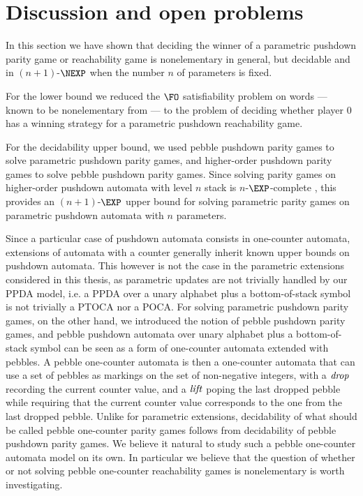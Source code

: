 {\section{Discussion and open problems}\label{discuss ppda}

In this section we have shown that
deciding
the winner of a parametric pushdown parity game or reachability game is nonelementary in general, but
decidable and in $(n+1)$-$\NEXP$ when the number $n$ of parameters is fixed.

	For the lower bound
we reduced the $\FO$ satisfiability problem on words \---- known to be nonelementary
from \cite{Sto74} \---- to the
problem of deciding whether player $0$ has a winning strategy for a parametric pushdown reachability game.

	For the decidability upper bound, we  used
	pebble pushdown parity games
	to solve 
	parametric pushdown parity games, and 
	 higher-order pushdown parity games to solve pebble pushdown parity games.
 Since solving parity games on higher-order pushdown automata with level $n$ stack is $n$-$\EXP$-complete \cite{ Cach03, cachat2007complexity}, this provides an $(n+1)$-$\EXP$ upper bound for solving parametric parity games on parametric pushdown automata with $n$ parameters.







 Since a particular case of pushdown automata consists in one-counter automata, extensions of automata with a counter generally inherit known upper bounds on pushdown automata. 
This however is not the case in
the parametric extensions considered in this thesis, as parametric updates
 are not trivially handled by our PPDA model, i.e. a PPDA over a unary alphabet plus a bottom-of-stack symbol is not trivially a PTOCA nor a POCA. 
For solving parametric pushdown parity games, on the other hand, we introduced the notion of pebble pushdown parity games, and
pebble pushdown automata over unary alphabet plus a bottom-of-stack symbol
can be seen as a form of one-counter automata extended with pebbles. 
A pebble one-counter automata is then a one-counter automata that
can use a set of pebbles as markings on the set of non-negative integers, with a 
$\text{\textit{drop}}$ recording the current counter value, and a 
$\text{\textit{lift}}$ poping the last dropped
pebble while requiring that the current counter value 
corresponds to the one from the last dropped pebble.
%
Unlike for parametric extensions, 
decidability of 
what should be called
pebble one-counter parity games follows from
decidability of pebble pushdown parity games. 
We believe it natural to study such a pebble one-counter automata model
on its own.
In particular we believe that the question of whether or not
solving pebble one-counter reachability games is nonelementary is worth investigating.


}

